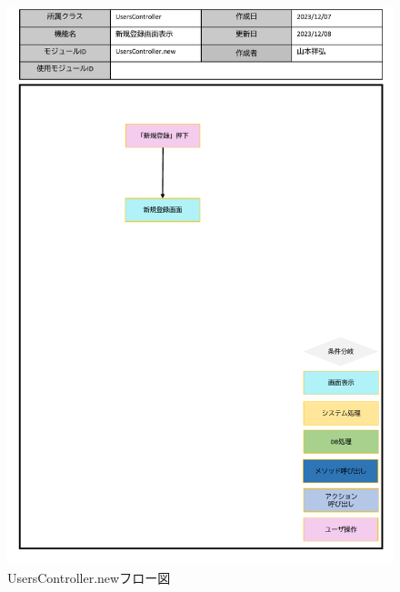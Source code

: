 \begin{figure}
	\centering
	\includegraphics[scale=0.6]{img/Users/pptx/UsersController_new.pdf}
	\caption{UsersController.newフロー図}
\end{figure}


\clearpage

